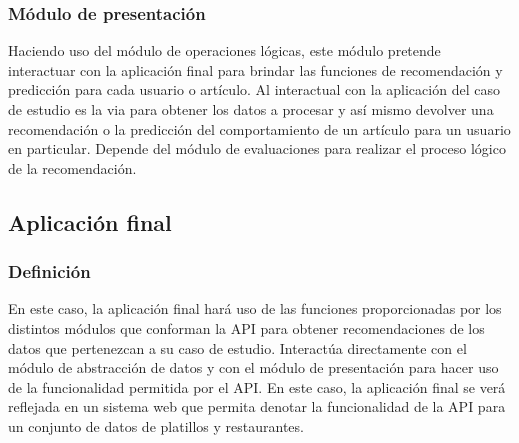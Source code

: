   \subsubsection{Módulo de presentación}
    Haciendo uso del módulo de operaciones lógicas, este módulo pretende interactuar con la aplicación final para brindar las funciones de recomendación y predicción para cada usuario o artículo. Al interactual con la aplicación del caso de estudio es la via para obtener los datos a procesar y así mismo devolver una recomendación o la predicción del comportamiento de un artículo para un usuario en particular. Depende del módulo de evaluaciones para realizar el proceso lógico de la recomendación.

\subsection{Aplicación final}
  \subsubsection{Definición}
    En este caso, la aplicación final hará uso de las funciones proporcionadas por los distintos módulos que conforman la API para obtener recomendaciones de los datos que pertenezcan a su caso de estudio. Interactúa directamente con el módulo de abstracción de datos y con el módulo de presentación para hacer uso de la funcionalidad permitida por el API. En este caso, la aplicación final se verá reflejada en un sistema web que permita denotar la funcionalidad de la API para un conjunto de datos de platillos y restaurantes.